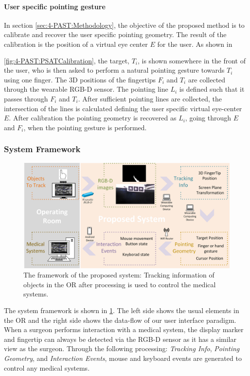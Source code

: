 \paragraph{User specific pointing gesture}
In section \ref{sec:4-PAST:Methodology}, the objective of the proposed method is to calibrate and recover the user specific pointing geometry. The result of the calibration is the position of a virtual eye center $E$ for the user.
As shown in \figurename{ \ref{fig:4-PAST:PSATCalibration}, the target, $T_i$, is shown somewhere in the front of the user, who is then asked to perform a natural pointing gesture towards $T_i$ using one finger. The 3D positions of the fingertips $F_i$ and $T_i$ are collected through the wearable RGB-D sensor. The pointing line $L_i$ is defined such that it passes through $F_i$ and $T_i$. After sufficient pointing lines are collected, the intersection of the lines is calculated defining the user specific virtual eye-center $E$. After calibration the pointing geometry is recovered as $L_{i}$, going through $E$ and  $F_i$, when the pointing gesture is performed.

\subsubsection{System Framework}

\begin{figure} [htb]
	\includegraphics[width=1\textwidth]{figures/4-PointingOR/Workflow.png}
	\caption{The framework of the proposed system: Tracking information of objects in the OR after processing is used to control the medical systems. }
	\label{fig:4-PointingOR:Workflow}       %
\end{figure}
The system framework is shown in \figurename{\ref{fig:4-PointingOR:Workflow}}.
The left side shows the usual elements in the OR and the right side shows the data-flow of our user interface paradigm. When a surgeon performs interaction with a medical system, the display marker and fingertip can always be detected via the RGB-D sensor as it has a similar view as the surgeon. 
Through the following processing: \textit{Tracking Info}, \textit{Pointing Geometry}, and \textit{Interaction Events}, mouse and keyboard events are generated to control any medical systems.
}
